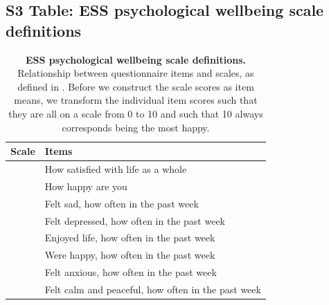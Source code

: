 \documentclass[a4paper,12pt]{article}
\begin{document}
\subsection*{S3 Table: ESS psychological wellbeing scale definitions}
\begin{table}[h]
\centering
\caption{{\bf ESS psychological wellbeing scale definitions.} Relationship between questionnaire items and scales, as defined in \cite{ESStopline5}. Before we construct the scale scores as item means, we transform the individual item scores such that they are all on a scale from 0 to 10 and such that 10 always corresponds being the most happy.}
\label{table:items}

\scriptsize
{}
\bgroup
\def\arraystretch{1.5}
\begin{tabular}{ll}
\hline
Scale & Items \\
\hline
\rowcolor{lightgray} & How satisfied with life as a whole \\
\rowcolor{lightgray}\multirow{-2}{*}{Evaluative wellbeing }& How happy are you\\

\rowcolor{white} & Felt sad, how often in the past week\\
\rowcolor{white} & Felt depressed, how often in the past week\\
\rowcolor{white} & Enjoyed life, how often in the past week\\
\rowcolor{white} & Were happy, how often in the past week\\
\rowcolor{white} & Felt anxious, how often in the past week\\
\rowcolor{white}\multirow{-6}{*}{Emotional wellbeing} & Felt calm and peaceful, how often in the past week\\


\end{tabular}
\end{table}
\end{document}
